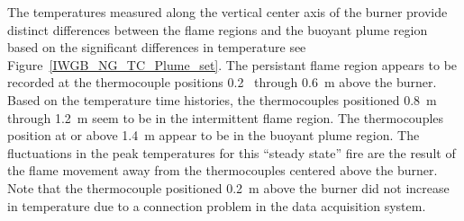 \documentclass[twoside]{uocthesis}
\begin{document}
The temperatures measured along the vertical center axis of the burner provide distinct differences between the flame regions and the buoyant plume region based on the significant differences in temperature see Figure~\ref{IWGB_NG_TC_Plume_set}.  The persistant flame region appears to be recorded at the thermocouple positions 0.2~ through 0.6~m above the burner.  Based on the temperature time histories, the thermocouples positioned 0.8~m through 1.2~m seem to be in the intermittent flame region.  The thermocouples position at or above 1.4~m appear to be in the buoyant plume region.  The fluctuations in the peak temperatures for this ``steady state'' fire are the result of the flame movement away from the thermocouples centered above the burner.  Note that the thermocouple positioned 0.2~m above the burner did not increase in temperature due to a connection problem in the data acquisition system.            
\end{document}
